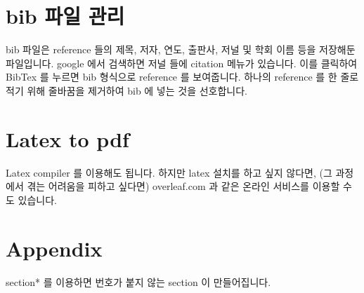\documentclass[11pt]{article}
\begin{document}
\section{bib 파일 관리}

bib 파일은 reference 들의 제목, 저자, 연도, 출판사, 저널 및 학회 이름 등을 저장해둔 파일입니다.
google 에서 검색하면 저널 들에 citation 메뉴가 있습니다.
이를 클릭하여 BibTex 를 누르면 bib 형식으로 reference 를 보여줍니다.
하나의 reference 를 한 줄로 적기 위해 줄바꿈을 제거하여 bib 에 넣는 것을 선호합니다.

\section{Latex to pdf}

Latex compiler 를 이용해도 됩니다.
하지만 latex 설치를 하고 싶지 않다면, (그 과정에서 겪는 어려움을 피하고 싶다면) overleaf.com 과 같은 온라인 서비스를 이용할 수도 있습니다.

%



\section*{Appendix}

section* 를 이용하면 번호가 붙지 않는 section 이 만들어집니다.
\end{document}
